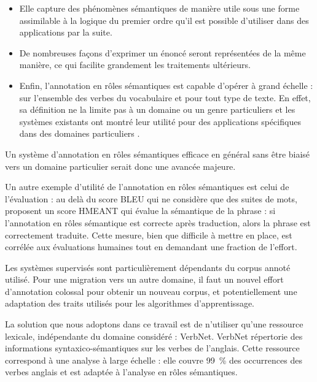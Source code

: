 \documentclass[oneside,parskip]{scrbook}
\begin{document}
\begin{itemize}

    \item Elle capture des phénomènes sémantiques de manière utile sous une
    forme assimilable à la logique du premier ordre qu'il est possible d'utiliser
    dans des applications par la suite.

    \item De nombreuses façons d'exprimer un énoncé seront représentées de la
    même manière, ce qui facilite grandement les traitements ultérieurs.

    \item Enfin, l'annotation en rôles sémantiques est capable d'opérer à grand
    échelle : sur l'ensemble des verbes du vocabulaire et pour tout type de texte.
    En effet, sa définition ne la limite pas à un domaine ou un genre particuliers
    et les systèmes existants ont montré leur utilité pour des applications
    spécifiques dans des domaines particuliers
    \citep{osman2012improved,xie2013semantic}.

\end{itemize}

Un système d'annotation en rôles sémantiques efficace en général sans être
biaisé vers un domaine particulier serait donc une avancée majeure.

Un autre exemple d'utilité de l'annotation en rôles sémantiques est celui de
l'évaluation : au delà du score BLEU qui ne considère que des suites de mots,
\cite{lo2011smt} proposent un score HMEANT qui évalue la sémantique de la
phrase : si l'annotation en rôles sémantique est correcte après traduction,
alors la phrase est correctement traduite. Cette mesure, bien que difficile à
mettre en place, est corrélée aux évaluations humaines tout en demandant une
fraction de l'effort.

Les systèmes supervisés sont particulièrement dépendants du corpus annoté
utilisé. Pour une migration vers un autre domaine, il faut un nouvel effort
d'annotation colossal pour obtenir un nouveau corpus, et potentiellement une
adaptation des traits utilisés pour les algorithmes d'apprentissage.

La solution que nous adoptons dans ce travail est de n'utiliser qu'une
ressource lexicale, indépendante du domaine considéré : VerbNet. VerbNet
répertorie des informations syntaxico-sémantiques sur les verbes de l'anglais.
Cette ressource correspond à une analyse à large échelle : elle couvre 99~\%
des occurrences des verbes anglais \citep[partie 1, p~.53]{palmer2013semantic}
et est adaptée à l'analyse en rôles sémantiques.
\end{document}
